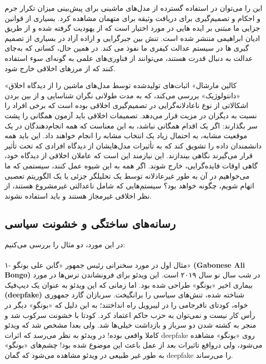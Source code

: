 \documentclass[12pt,oneside]{book}
\begin{document}
    این را می‌توان در استفاده گسترده از مدل‌های ماشینی برای پیش‌بینی میزان تکرار جرم و احکام و تصمیم‌گیری برای دریافت وثیقه برای متهمان مشاهده کرد.
    بسیاری از قوانین جزایی ما مبتنی بر ایده هایی در مورد اختیار است که از یهودیت گرفته شده و از طریق ادیان ابراهیمی منتشر شده است.
    تنش بین جبرگرایی و اراده آزاد در بسیاری از تصمیم گیری ها در سیستم عدالت کیفری ما نفوذ می کند.
    در همین حال، کسانی که به‌جای عدالت به دنبال قدرت هستند، می‌توانند از فناوری‌های علمی به گونه‌ای سوء استفاده کنند که از مرزهای اخلاقی خارج شود.

    «کالین مارشال» اثبات‌های تولیدشده توسط مدل‌های ماشین را از دیدگاه اخلاق «دانتولوژیک» بررسی می‌کند، که به مدت طولانی نگران شناسایی و از بین بردن اشکالاتی از نوع ناعادلانه‌گرایی در تصمیم‌گیری اخلاقی بوده است که برخی افراد را نسبت به دیگران در مزیت قرار می‌دهد.
    تصمیمات اخلاقی باید آزمون همگانی را پشت سر بگذارند: اگر یک اقدام همگانی نباشد، به این معناست که همه انجام‌دهندگان در یک موقعیت مشابه، به احتمال زیاد یک انتخاب مشابه را انجام خواهند داد.
    این باید همه دانشمندان داده را تشویق کند که به تأثیرات مدل‌هایشان از دیدگاه افرادی که تحت تأثیر قرار می‌گیرند نگاهی بیندازند.
    این نیازمند این است که عاملان اخلاقی از دیدگاه خود، گاهی اوقات فایده‌گرایی، خارج شوند.
    اگر همه به این شیوه عمل کنند، سیستمی که ما می‌خواهیم در آن به طور غیرعادلانه توسط یک تحلیلگر جزئی یا یک الگوریتم تعصبی اتهام شویم، چگونه خواهد بود؟ سیستم‌هایی که شامل ناعدالتی غیرمشروع هستند، از نظر اخلاقی غیرمجاز هستند و باید استفاده نشوند.

    \subsection{رسانه‌های ساختگی و خشونت سیاسی}
    در این مورد، دو مثال را بررسی می‌کنیم:
    \paragraph{}
    ۱- مثال اول در مورد سخنرانی رئیس جمهور «گابن علی بونگو» \textenglish{\textbf{(Gabonese Ali Bongo)}} در شب سال نو سال ۲۰۱۹ است.
    این ویدئو برای فرونشاندن ترس‌ها در مورد بیماری اخیر «بونگو» طراحی شده بود.
    اما زمانی که این ویدئو به عنوان یک دیپ‌فیک \textenglish{\textbf{(deepfake)}} شناخته شده، تنش‌های سیاسی را برانگیخت.
    سربازان گارد جمهوری خواه، کودتای نافرجامی را در لیبرویل راه انداختند؛ به این دلیل که «بونگو» دیگر در رأس کار نیست و نمی‌توان به حزب حاکم اعتماد کرد.
    کودتا با خشونت سرکوب شد و منجر به کشته شدن دو سرباز و بازداشت خیلی‌ها شد.
    ولی بعدا مشخص شد که ویدئو کاملا واقعی بوده!
    در ویدئو به نظر می‌رسد که اثرات deepfake روی «بونگو» مشاهده می‌شود، ولی درواقع تاثیرات بعد از عمل باعث این موضوع شده بود!
    چشم‌های «بونگو» به طور غیر طبیعی در ویدئو مشاهده می‌شود که گمان deepfake را می‌رساند.
\end{document}
